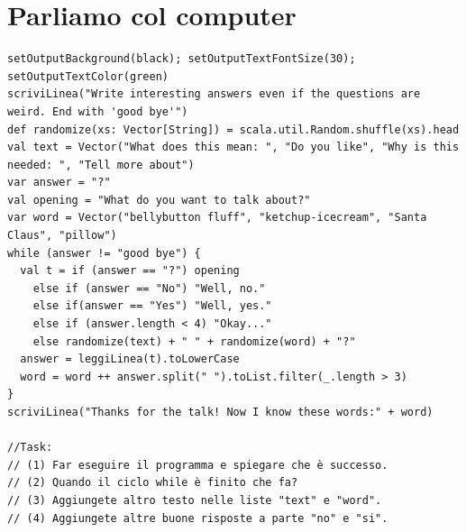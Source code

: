\chapter{Parliamo col computer}
\begin{lstlisting}[basicstyle={\ttfamily\fontsize{13}{16}\selectfont},numbers=none]
setOutputBackground(black); setOutputTextFontSize(30); setOutputTextColor(green)
scriviLinea("Write interesting answers even if the questions are weird. End with 'good bye'")
def randomize(xs: Vector[String]) = scala.util.Random.shuffle(xs).head
val text = Vector("What does this mean: ", "Do you like", "Why is this needed: ", "Tell more about")
var answer = "?"
val opening = "What do you want to talk about?"
var word = Vector("bellybutton fluff", "ketchup-icecream", "Santa Claus", "pillow") 
while (answer != "good bye") {
  val t = if (answer == "?") opening 
    else if (answer == "No") "Well, no." 
    else if(answer == "Yes") "Well, yes." 
    else if (answer.length < 4) "Okay..." 
    else randomize(text) + " " + randomize(word) + "?"
  answer = leggiLinea(t).toLowerCase
  word = word ++ answer.split(" ").toList.filter(_.length > 3) 
} 
scriviLinea("Thanks for the talk! Now I know these words:" + word)

//Task:
// (1) Far eseguire il programma e spiegare che è successo.
// (2) Quando il ciclo while è finito che fa? 
// (3) Aggiungete altro testo nelle liste "text" e "word".
// (4) Aggiungete altre buone risposte a parte "no" e "si".
\end{lstlisting}
        
